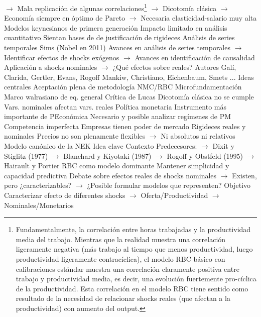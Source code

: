 \documentclass{nuevotema}
\begin{document}
\begin{esquemal}
				\4[] $\to$ Mala replicación de algunas correlaciones\footnote{Fundamentalmente, la correlación entre horas trabajadas y la productividad media del trabajo. Mientras que la realidad muestra una correlación ligeramente negativa (más trabajo al tiempo que menos productividad, luego productividad ligeramente contracíclica), el modelo RBC básico con calibraciones estándar muestra una correlación claramente positiva entre trabajo y productividad media, es decir, una evolución fuertemente pro-cíclica de la productividad. Esta correlación en el modelo RBC tiene sentido como resultado de la necesidad de relacionar shocks reales (que afectan a la productividad) con aumento del output.}
				\4[] $\to$ Dicotomía clásica
				\4[] $\to$ Economía siempre en óptimo de Pareto
				\4[] $\to$ Necesaria elasticidad-salario muy alta
				\4 Modelos keynesianos de primera generación
				\4[] Impacto limitado en análisis cuantitativo
				\4[] Sientan bases de de justificación de rigideces
				\4 Análisis de series temporales
				\4[] Sims (Nobel en 2011)
				\4[] Avances en análisis de series temporales
				\4[] $\to$ Identificar efectos de shocks exógenos
				\4[] $\to$ Avances en identificación de causalidad
				\4[] Aplicación a shocks nominales
				\4[] $\to$ ¿Qué efectos sobre reales?
			\3 Autores
				\4 Galí, Clarida, Gertler, Evans, Rogoff
				\4 Mankiw, Christiano, Eichenbaum, Smets
				\4[] ...
			\3 Ideas centrales
				\4 Aceptación plena de metodología NMC/RBC
				\4[] Microfundamentación
				\4[] Marco walrasiano de eq. general
				\4[] Crítica de Lucas
				\4 Dicotomía clásica no se cumple
				\4[] Vars. nominales afectan vars. reales
				\4 Política monetaria
				\4[] Instrumento más importante de PEconómica
				\4[] Necesario y posible analizar regímenes de PM
				\4 Competencia imperfecta
				\4[] Empresas tienen poder de mercado
				\4 Rigideces reales y nominales
				\4[] Precios no son plenamente flexibles
				\4[] $\to$ Ni absolutos ni relativos
		\2 Modelo canónico de la NEK
			\3 Idea clave
				\4 Contexto
				\4[] Predecesores:
				\4[] $\to$ Dixit y Stiglitz (1977)
				\4[] $\to$ Blanchard y Kiyotaki (1987)
				\4[] $\to$ Rogoff y Obstfeld (1995)
				\4[] $\to$ Hairault y Portier
				\4[] RBC como modelo dominante
				\4[] Mantener simplicidad y capacidad predictiva
				\4[] Debate sobre efectos reales de shocks nominales
				\4[] $\to$ Existen, pero ¿caracterizables?
				\4[] $\to$ ¿Posible formular modelos que representen?
				\4 Objetivo
				\4[] Caracterizar efecto de diferentes shocks
				\4[] $\to$ Oferta/Productividad
				\4[] $\to$ Nominales/Monetarios

\end{esquemal}
\end{document}
